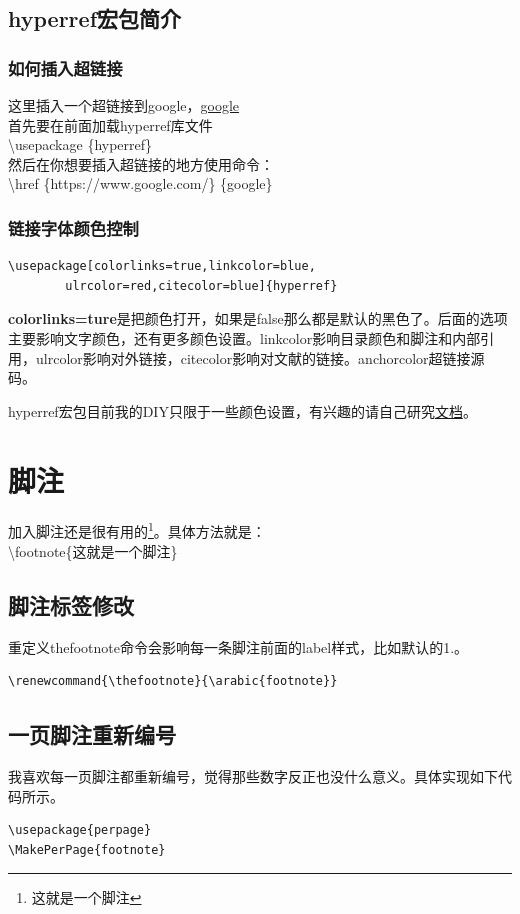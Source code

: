 \documentclass[11pt,oneside]{book}
\begin{document}
\section{hyperref宏包简介}
\subsection{如何插入超链接}
这里插入一个超链接到google，\href{https://www.google.com/}{google}\\
首先要在前面加载hyperref库文件\\
\textbackslash usepackage \{hyperref\}\\
然后在你想要插入超链接的地方使用命令：\\
\textbackslash href \{https://www.google.com/\} \{google\}

\subsection{链接字体颜色控制}
\begin{Verbatim}
\usepackage[colorlinks=true,linkcolor=blue,
        ulrcolor=red,citecolor=blue]{hyperref} 
\end{Verbatim}

\textbf{colorlinks=ture}是把颜色打开，如果是false那么都是默认的黑色了。后面的选项主要影响文字颜色，还有更多颜色设置。linkcolor影响目录颜色和脚注和内部引用，ulrcolor影响对外链接，citecolor影响对文献的链接。anchorcolor超链接源码。

hyperref宏包目前我的DIY只限于一些颜色设置，有兴趣的请自己研究\href{http://mirrors.ctan.org/macros/latex/contrib/hyperref/doc/manual.pdf}{文档}。



\chapter{脚注}
加入脚注还是很有用的\footnote{这就是一个脚注}。具体方法就是：\\
\textbackslash footnote\{这就是一个脚注\} 

\section{脚注标签修改}
重定义thefootnote命令会影响每一条脚注前面的label样式，比如默认的1.。
\begin{Verbatim}
\renewcommand{\thefootnote}{\arabic{footnote}}
\end{Verbatim}


\section{一页脚注重新编号}
我喜欢每一页脚注都重新编号，觉得那些数字反正也没什么意义。具体实现如下代码所示。
\begin{Verbatim}
\usepackage{perpage} 
\MakePerPage{footnote} 
\end{Verbatim}
\end{document}
